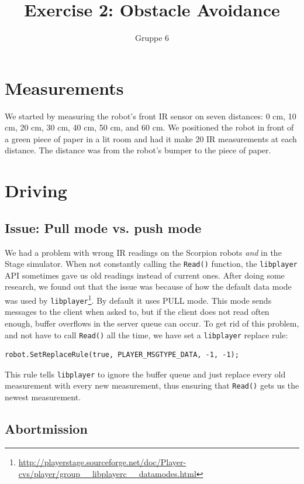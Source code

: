\documentclass[a4paper,12pt]{article}
\title{Exercise 2: Obstacle Avoidance}
\author{Gruppe 6}
\begin{document}
\maketitle

\section{Measurements}

We started by measuring the robot's front IR sensor on seven distances: 0 cm, 10
cm, 20 cm, 30 cm, 40 cm, 50 cm, and 60 cm.  We positioned the robot in front of
a green piece of paper in a lit room and had it make 20 IR measurements at each
distance.  The distance was from the robot's bumper to the piece of paper.


\section{Driving}

\subsection{Issue: Pull mode vs. push mode}

We had a problem with wrong IR readings on the Scorpion robots \emph{and} in the
Stage simulator.  When not constantly calling the \texttt{Read()} function, the
\texttt{libplayer} API sometimes gave us old readings instead of current ones.
After doing some research, we found out that the issue was because of how the
default data mode was used by
\texttt{libplayer}\footnote{\url{http://playerstage.sourceforge.net/doc/Player-cvs/player/group__libplayerc__datamodes.html}}.
By default it uses PULL mode.  This mode sends messages to the client when asked
to, but if the client does not read often enough, buffer overflows in the server
queue can occur.  To get rid of this problem, and not have to call
\texttt{Read()} all the time, we have set a \texttt{libplayer} replace rule:

\begin{verbatim}
robot.SetReplaceRule(true, PLAYER_MSGTYPE_DATA, -1, -1);
\end{verbatim}

This rule tells \texttt{libplayer} to ignore the buffer queue and just replace
every old measurement with every new measurement, thus ensuring that
\texttt{Read()} gets us the newest measurement.


\subsection{Abortmission}
\end{document}
